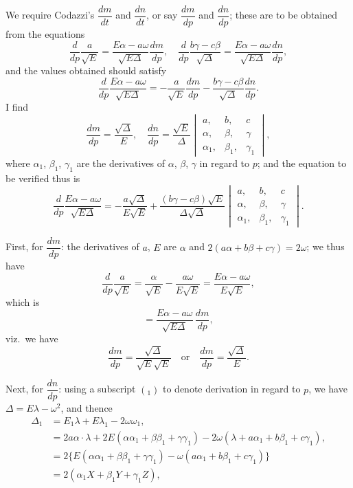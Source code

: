 \documentclass[11pt]{article}
\begin{document}
We require Codazzi's $\dfrac{dm}{dt}$ and $\dfrac{dn}{dt}$, or say $\dfrac{dm}{dp}$ and $\dfrac{dn}{dp}$; these are to be obtained from the equations
\[
\frac{d}{dp}\frac{a}{\sqrt{E}} = \frac{E\alpha-a\omega}{\sqrt{E\Delta}}\frac{dm}{dp},\quad \frac{d}{dp}\frac{b\gamma-c\beta}{\sqrt{\Delta}} = \frac{E\alpha-a\omega}{\sqrt{E\Delta}}\frac{dn}{dp},
\]
and the values obtained should satisfy
\[
\frac{d}{dp}\frac{E\alpha-a\omega}{\sqrt{E\Delta}} = -\frac{a}{\sqrt{E}}\frac{dm}{dp} - \frac{b\gamma-c\beta}{\sqrt{\Delta}}\frac{dn}{dp}.
\]
I find
\[
\frac{dm}{dp} = \frac{\sqrt{\Delta}}{E},\quad \frac{dn}{dp} = \frac{\sqrt{E}}{\Delta}
\begin{vmatrix}
a, & b, & c \\
\alpha, & \beta, & \gamma \\
\alpha_1, & \beta_1, & \gamma_1
\end{vmatrix},
\]
where $\alpha_1$, $\beta_1$, $\gamma_1$ are the derivatives of $\alpha$, $\beta$, $\gamma$ in regard to $p$; and the equation to be verified thus is
\[
\frac{d}{dp}\frac{E\alpha-a\omega}{\sqrt{E\Delta}} = -\frac{a\sqrt{\Delta}}{E\sqrt{E}} + \frac{(b\gamma-c\beta)\sqrt{E}}{\Delta\sqrt{\Delta}}
\begin{vmatrix}
a, & b, & c \\
\alpha, & \beta, & \gamma \\
\alpha_1, & \beta_1, & \gamma_1
\end{vmatrix}.
\]

First, for $\dfrac{dm}{dp}$: the derivatives of $a$, $E$ are $\alpha$ and $2(a\alpha+b\beta+c\gamma) = 2\omega$; we thus have
\[
\frac{d}{dp}\frac{a}{\sqrt{E}} = \frac{\alpha}{\sqrt{E}} - \frac{a\omega}{E\sqrt{E}} = \frac{E\alpha-a\omega}{E\sqrt{E}},
\]
which is
\[
= \frac{E\alpha-a\omega}{\sqrt{E\Delta}}\,\frac{dm}{dp},
\]
viz.\ we have
\[
\frac{dm}{dp} = \frac{\sqrt{\Delta}}{\sqrt{E}\sqrt{E}}\quad\text{or}\quad \frac{dm}{dp} = \frac{\sqrt{\Delta}}{E}.
\]

Next, for $\dfrac{dn}{dp}$: using a subscript $({}_1)$ to denote derivation in regard to $p$, we have $\Delta = E\lambda - \omega^2$, and thence
\begin{align*}
\Delta_1 &= E_1\lambda + E\lambda_1 - 2\omega\omega_1,\\
&= 2a\alpha\cdot\lambda + 2E(\alpha\alpha_1+\beta\beta_1+\gamma\gamma_1) - 2\omega(\lambda+a\alpha_1+b\beta_1+c\gamma_1),\\
&= 2\{E(\alpha\alpha_1+\beta\beta_1+\gamma\gamma_1) - \omega(a\alpha_1+b\beta_1+c\gamma_1)\}\\
&= 2(\alpha_1 X + \beta_1 Y + \gamma_1 Z),
\end{align*}
\end{document}
